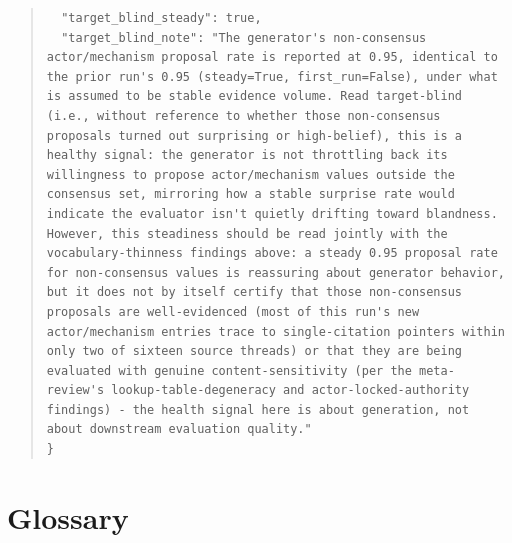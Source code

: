 \documentclass[11pt]{article}
\begin{document}
\begin{quote}
\begin{verbatim}
  "target_blind_steady": true,
  "target_blind_note": "The generator's non-consensus actor/mechanism proposal rate is reported at 0.95, identical to the prior run's 0.95 (steady=True, first_run=False), under what is assumed to be stable evidence volume. Read target-blind (i.e., without reference to whether those non-consensus proposals turned out surprising or high-belief), this is a healthy signal: the generator is not throttling back its willingness to propose actor/mechanism values outside the consensus set, mirroring how a stable surprise rate would indicate the evaluator isn't quietly drifting toward blandness. However, this steadiness should be read jointly with the vocabulary-thinness findings above: a steady 0.95 proposal rate for non-consensus values is reassuring about generator behavior, but it does not by itself certify that those non-consensus proposals are well-evidenced (most of this run's new actor/mechanism entries trace to single-citation pointers within only two of sixteen source threads) or that they are being evaluated with genuine content-sensitivity (per the meta-review's lookup-table-degeneracy and actor-locked-authority findings) - the health signal here is about generation, not about downstream evaluation quality."
}
\end{verbatim}
\end{quote}

\printbibliography

\appendix

\section{Glossary}
\label{app:glossary}

\end{document}
